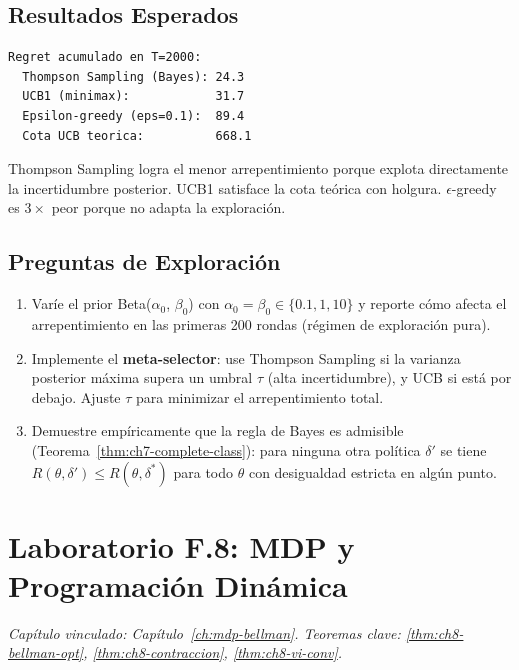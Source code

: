 \subsection*{Resultados Esperados}

\begin{verbatim}
Regret acumulado en T=2000:
  Thompson Sampling (Bayes): 24.3
  UCB1 (minimax):            31.7
  Epsilon-greedy (eps=0.1):  89.4
  Cota UCB teorica:          668.1
\end{verbatim}

Thompson Sampling logra el menor arrepentimiento porque explota directamente
la incertidumbre posterior. UCB1 satisface la cota teórica con holgura.
$\epsilon$-greedy es $3\times$ peor porque no adapta la exploración.

\subsection*{Preguntas de Exploración}

\begin{enumerate}
    \item Varíe el prior Beta($\alpha_0$, $\beta_0$) con $\alpha_0=\beta_0 \in
          \{0.1, 1, 10\}$ y reporte cómo afecta el arrepentimiento en las
          primeras 200 rondas (régimen de exploración pura).
    \item Implemente el \textbf{meta-selector}: use Thompson Sampling si
          la varianza posterior máxima supera un umbral $\tau$ (alta
          incertidumbre), y UCB si está por debajo. Ajuste $\tau$ para
          minimizar el arrepentimiento total.
    \item Demuestre empíricamente que la regla de Bayes es admisible
          (Teorema~\ref{thm:ch7-complete-class}): para ninguna otra
          política $\delta'$ se tiene $R(\theta,\delta') \leq R(\theta,\delta^*)$
          para todo $\theta$ con desigualdad estricta en algún punto.
\end{enumerate}

\section{Laboratorio F.8: MDP y Programación Dinámica}
\label{lab:F8}
\textit{Capítulo vinculado: Capítulo~\ref{ch:mdp-bellman}.
Teoremas clave: \ref{thm:ch8-bellman-opt}, \ref{thm:ch8-contraccion},
\ref{thm:ch8-vi-conv}.}

